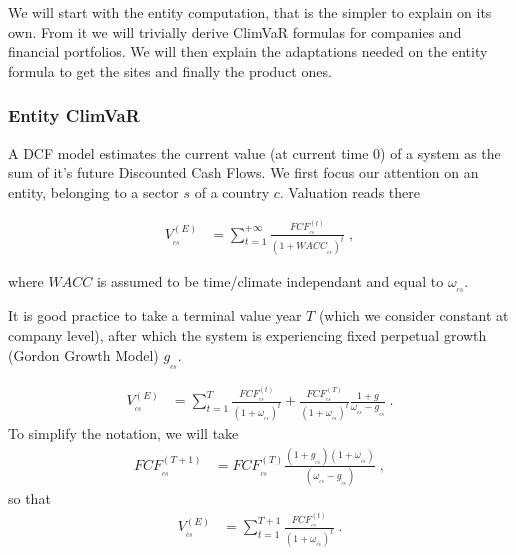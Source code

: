 \vspace{0.2cm}

We will start with the entity computation, that is the simpler to explain on its own. From it we will trivially derive ClimVaR formulas for companies and financial portfolios. We will then explain the adaptations needed on the entity formula to get the sites and finally the product ones.

\subsubsection{Entity ClimVaR} \label{sec:climvar-entity}

\vspace{0.2cm}

A DCF model \cite{Kruschwitz}\cite{Valuation} estimates the current value (at current time $0$) of a system as the sum of it's future Discounted Cash Flows. We first focus our attention on an entity, belonging to a sector $s$ of a country $c$. Valuation reads there

\begin{align}
V^{(E)}_{_{cs}}&=\sum_{t=1}^{+\infty}\frac{FCF^{(t)}_{_{cs}}}{(1+WACC_{_{cs}})^t}\;,\label{eq:base-val}
\end{align}

where $W\!ACC$ is assumed to be time/climate independant and equal to $\omega_{_{cs}}$. 

\vspace{0.2cm}

It is good practice to take a terminal value year $T$ (which we consider constant at company level), after which the system is experiencing fixed perpetual growth (Gordon Growth Model) $g_{_{cs}}$. 

\begin{align}
V^{(E)}_{_{cs}}&=\sum_{t=1}^{T}\frac{FCF^{(t)}_{_{cs}}}{\left(1+\omega_{_{cs}}\right)^t}
%
+\frac{FCF^{(T)}_{_{cs}}}{\left(1+\omega_{_{cs}}\right)^t}\frac{1+g}{\omega_{_{cs}}-g_{_{cs}}}\;.
\end{align}
To simplify the notation, we will take 
\begin{align}
FCF^{(T+1)}_{_{cs}}&=FCF^{(T)}_{_{cs}}\frac{(1+g_{_{cs}})(1+\omega_{_{cs}})}{(\omega_{_{cs}}-g_{_{cs}})}\;,\label{eq:perpetfcf}
\end{align}
so that
\begin{align}
V^{(E)}_{_{cs}}&=\sum_{t=1}^{T+1}\frac{FCF^{(t)}_{_{cs}}}{\left(1+\omega_{_{cs}}\right)^t}\;.
\end{align}

